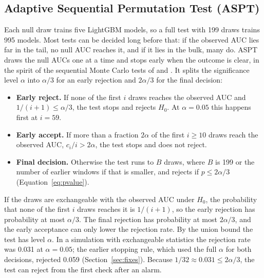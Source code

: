 \subsection{Adaptive Sequential Permutation Test (ASPT)}
\label{sec:aspt}
Each null draw trains five LightGBM models, so a full test with 199 draws trains 995 models. Most tests can be decided long before that: if the observed AUC lies far in the tail, no null AUC reaches it, and if it lies in the bulk, many do. ASPT draws the null AUCs one at a time and stops early when the outcome is clear, in the spirit of the sequential Monte Carlo tests of \citet{BesagClifford1991} and \citet{Gandy2009}. It splits the significance level $\alpha$ into $\alpha/3$ for an early rejection and $2\alpha/3$ for the final decision:
\begin{itemize}
    \item \textbf{Early reject.} If none of the first $i$ draws reaches the observed AUC and $1/(i+1) \leq \alpha/3$, the test stops and rejects $H_0$. At $\alpha = 0.05$ this happens first at $i = 59$.
    \item \textbf{Early accept.} If more than a fraction $2\alpha$ of the first $i \geq 10$ draws reach the observed AUC, $c_i/i > 2\alpha$, the test stops and does not reject.
    \item \textbf{Final decision.} Otherwise the test runs to $B$ draws, where $B$ is 199 or the number of earlier windows if that is smaller, and rejects if $p \leq 2\alpha/3$ (Equation~\ref{eq:pvalue}).
\end{itemize}
If the draws are exchangeable with the observed AUC under $H_0$, the probability that none of the first $i$ draws reaches it is $1/(i+1)$, so the early rejection has probability at most $\alpha/3$. The final rejection has probability at most $2\alpha/3$, and the early acceptance can only lower the rejection rate. By the union bound the test has level $\alpha$. In a simulation with exchangeable statistics the rejection rate was 0.031 at $\alpha = 0.05$; the earlier stopping rule, which used the full $\alpha$ for both decisions, rejected 0.059 (Section~\ref{sec:fixes}). Because $1/32 \approx 0.031 \leq 2\alpha/3$, the test can reject from the first check after an alarm.

